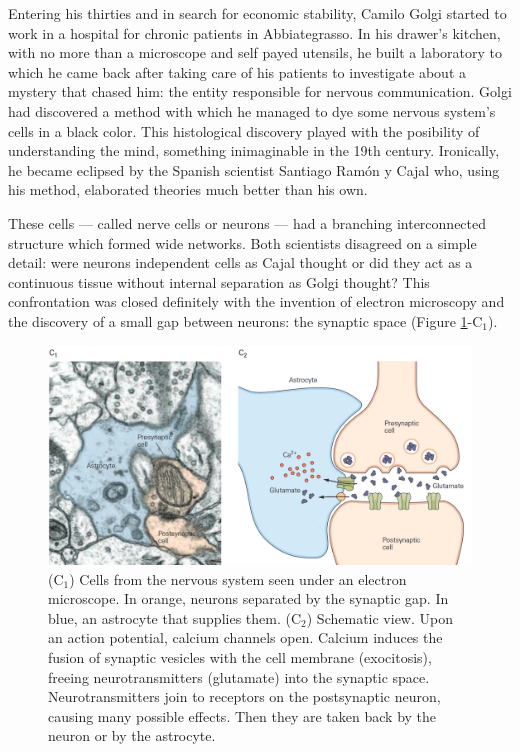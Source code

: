 Entering his thirties and in search for economic stability, Camilo Golgi started to work in a hospital for chronic patients in Abbiategrasso. In his drawer's kitchen, with no more than a microscope and self payed utensils, he built a laboratory to which he came back after taking care of his patients to investigate about a mystery that chased him: the entity responsible for nervous communication. Golgi had discovered a method with which he managed to dye some nervous system's cells in a black color. This histological discovery played with the posibility of understanding the mind, something inimaginable in the 19th century. Ironically, he became eclipsed by the Spanish scientist Santiago Ramón y Cajal who, using his method, elaborated theories much better than his own.

These cells --- called nerve cells or neurons --- had a branching interconnected structure which formed wide networks. Both scientists disagreed on a simple detail: were neurons independent cells as Cajal thought or did they act as a continuous tissue without internal separation as Golgi thought? This confrontation was closed definitely with the invention of electron microscopy and the discovery of a small gap between neurons: the synaptic space (Figure \ref{synapse}-C$_1$).

\begin{figure}[H]
	\centering

	\includegraphics[width=\linewidth]{media/3-synapse.png}
	\caption{(C$_1$) Cells from the nervous system seen under an electron microscope. In orange, neurons separated by the synaptic gap. In blue, an astrocyte that supplies them. (C$_2$) Schematic view. Upon an action potential, calcium channels open. Calcium induces the fusion of synaptic vesicles with the cell membrane (exocitosis), freeing neurotransmitters (glutamate) into the synaptic space. Neurotransmitters join to receptors on the postsynaptic neuron, causing many possible effects. Then they are taken back by the neuron or by the astrocyte.}
	\label{synapse}
\end{figure}

